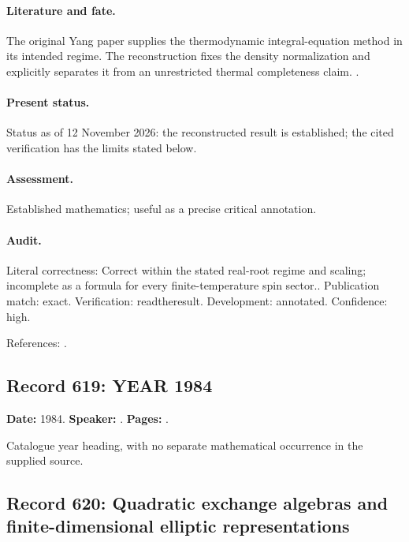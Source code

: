 \paragraph{Literature and fate.} The original Yang paper supplies the thermodynamic integral-equation method in its intended regime. The reconstruction fixes the density normalization and explicitly separates it from an unrestricted thermal completeness claim. \citep{yang1967manybody}.

\paragraph{Present status.} Status as of 12 November 2026: the reconstructed result is established; the cited verification has the limits stated below.

\paragraph{Assessment.} Established mathematics; useful as a precise critical annotation.

\paragraph{Audit.} Literal correctness: Correct within the stated real-root regime and scaling; incomplete as a formula for every finite-temperature spin sector.. Publication match: exact. Verification: readtheresult. Development: annotated. Confidence: high.

\noindent References: \citep{yang1967manybody}.\par

\subsection{Record 619: YEAR 1984}

\label{talk:619}

\noindent\textbf{Date:} 1984. \textbf{Speaker:} . \textbf{Pages:} .\par

Catalogue year heading, with no separate mathematical occurrence in the supplied source.

\subsection{Record 620: Quadratic exchange algebras and finite-dimensional elliptic representations}

